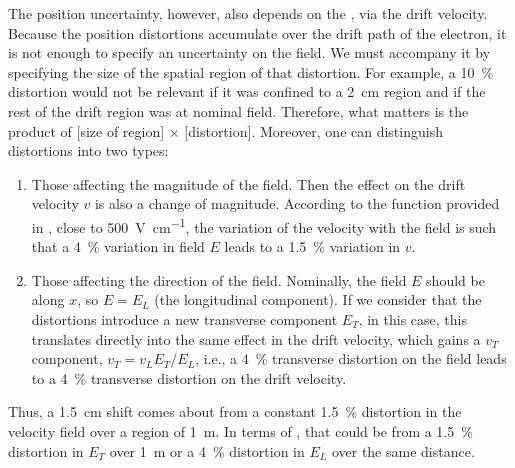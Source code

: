 The position uncertainty, however, also depends on the \efield, via the drift velocity. Because the position distortions accumulate over the drift path of the electron, it is not enough to specify an uncertainty on the field. We must accompany it by specifying the size of the spatial region of that distortion. For example, a \SI{10}{\%} distortion would not be relevant if it was confined to a \SI{2}{\cm} region and if the rest of the drift region was at nominal field.
Therefore, what matters is the product of [size of region] $\times$ [distortion]. Moreover, one can distinguish distortions into two types:
\begin{enumerate}
\item Those affecting the magnitude of the field. Then the effect on the drift velocity $v$ is also a change of magnitude. According to the function provided in \cite{Walkowiak:2000wf}, close to \SI{500}{\V\per\cm}, the variation of the velocity with the field is such that a \SI{4}{\%} variation in field $E$ leads to a \SI{1.5}{\%} variation in $v$.
\item Those affecting the direction of the field. Nominally, the field $E$ should be along $x$, so $E = E_L$ (the longitudinal component). If we consider that the distortions introduce a new transverse component $E_T$, in this case, this translates directly into the same effect in the drift velocity, which gains a $v_T$ component, $v_T=v_L  E_T/E_L $, i.e., a \SI{4}{\%} transverse distortion on the field leads to a \SI{4}{\%} transverse distortion on the drift velocity.
\end{enumerate}

Thus, a \SI{1.5}{\cm} shift comes about from a constant \SI{1.5}{\%} distortion in the velocity field over a region of \SI{1}{\m}. In terms of \efield, that could be from a \SI{1.5}{\%} distortion in $E_T$ over \SI{1}{\m} or a \SI{4}{\%} distortion in $E_L$ over the same distance.

